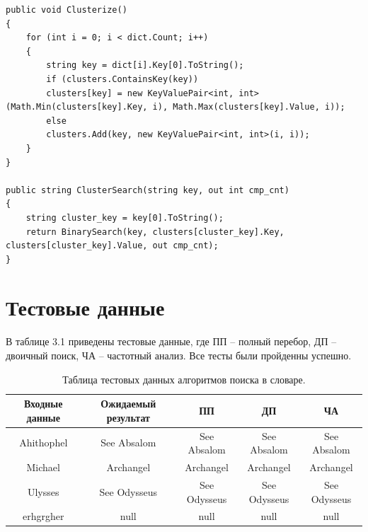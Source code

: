 \documentclass[12pt]{report}
\begin{document}
\begin{lstlisting}[label=some-code,caption=Алгоритм поиска с использованием частотного анализа]
public void Clusterize()
{
	for (int i = 0; i < dict.Count; i++)
	{
		string key = dict[i].Key[0].ToString();
		if (clusters.ContainsKey(key))
		clusters[key] = new KeyValuePair<int, int>(Math.Min(clusters[key].Key, i), Math.Max(clusters[key].Value, i));
		else
		clusters.Add(key, new KeyValuePair<int, int>(i, i));
	}
}

public string ClusterSearch(string key, out int cmp_cnt)
{
	string cluster_key = key[0].ToString();
	return BinarySearch(key, clusters[cluster_key].Key, clusters[cluster_key].Value, out cmp_cnt);
}
\end{lstlisting}
\captionsetup{singlelinecheck = false, justification=centering}

\section{Тестовые данные}

В таблице 3.1 приведены тестовые данные, где ПП -- полный перебор, ДП -- двоичный поиск, ЧА -- частотный анализ. Все тесты были пройденны успешно.

\begin{table}[H]
	\caption{Таблица тестовых данных алгоритмов поиска в словаре.}
	
	\begin{center}
		
		\begin{tabular}{|c c c c c|} 
			
			\hline
			
			Входные данные & Ожидаемый результат & ПП & ДП & ЧА \\  
			
			\hline
			
			Ahithophel & See Absalom & See Absalom & See Absalom & See Absalom \\
			
			\hline
			
			Michael & Archangel & Archangel & Archangel & Archangel \\
			
			\hline
			
			Ulysses & See Odysseus & See Odysseus & See Odysseus & See Odysseus \\
			
			\hline
			
			erhgrgher & null & null & null & null \\
			\hline
		\end{tabular}
		
	\end{center}
	
\end{table}
\end{document}
